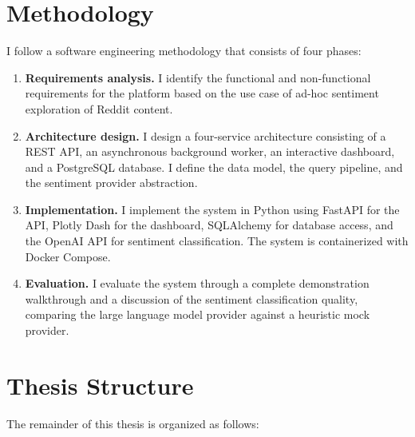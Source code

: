 \section{Methodology}
\label{sec:methodology}

I follow a software engineering methodology that consists of four phases:

\begin{enumerate}
    \item \textbf{Requirements analysis.} I identify the functional and non-functional requirements for the platform based on the use case of ad-hoc sentiment exploration of Reddit content.

    \item \textbf{Architecture design.} I design a four-service architecture consisting of a REST API, an asynchronous background worker, an interactive dashboard, and a PostgreSQL database. I define the data model, the query pipeline, and the sentiment provider abstraction.

    \item \textbf{Implementation.} I implement the system in Python using FastAPI for the API, Plotly Dash for the dashboard, SQLAlchemy for database access, and the OpenAI API for sentiment classification. The system is containerized with Docker Compose.

    \item \textbf{Evaluation.} I evaluate the system through a complete demonstration walkthrough and a discussion of the sentiment classification quality, comparing the large language model provider against a heuristic mock provider.
\end{enumerate}

\section{Thesis Structure}
\label{sec:thesis_structure}

The remainder of this thesis is organized as follows:

